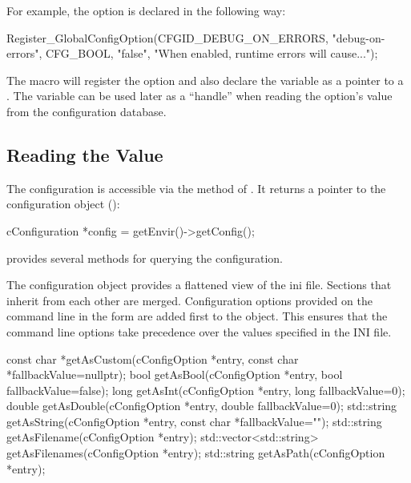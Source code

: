 For example, the  option is declared in the following way:

\begin{cpp}
Register_GlobalConfigOption(CFGID_DEBUG_ON_ERRORS, "debug-on-errors",
    CFG_BOOL, "false", "When enabled, runtime errors will cause...");
\end{cpp}

The macro will register the option and also declare the
 variable as a pointer to a
. The variable can be used later as a ``handle'' when
reading the option's value from the configuration database.

\subsection{Reading the Value}
\label{sec:plugin-exts:configoption:reading-values}

The configuration is accessible via the  method of .
It returns a pointer to the configuration object ():

\begin{cpp}
cConfiguration *config = getEnvir()->getConfig();
\end{cpp}

 provides several methods for querying the configuration.

\begin{note}
The configuration object provides a flattened view of the ini file. Sections
that inherit from each other are merged. Configuration options provided
on the command line in the form  are added first to the object.
This ensures that the command line options take precedence over the values specified
in the INI file.
\end{note}

\begin{cpp}
const char *getAsCustom(cConfigOption *entry, const char *fallbackValue=nullptr);
bool getAsBool(cConfigOption *entry, bool fallbackValue=false);
long getAsInt(cConfigOption *entry, long fallbackValue=0);
double getAsDouble(cConfigOption *entry, double fallbackValue=0);
std::string getAsString(cConfigOption *entry, const char *fallbackValue="");
std::string getAsFilename(cConfigOption *entry);
std::vector<std::string> getAsFilenames(cConfigOption *entry);
std::string getAsPath(cConfigOption *entry);
\end{cpp}


